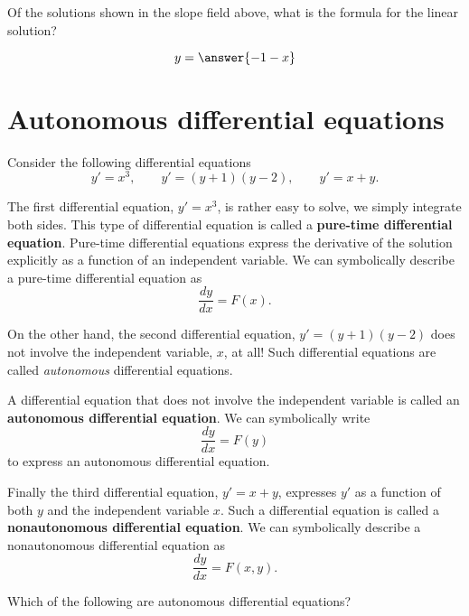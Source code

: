 \documentclass{ximera}
\begin{document}
\begin{question}
  Of the solutions shown in the slope field above, what is the formula
  for the linear solution?
  \begin{prompt}
    \[
    y = \answer{-1-x}
    \]
  \end{prompt}
\end{question}



\section{Autonomous differential equations}


Consider the following differential equations
\[
y' = x^3,\qquad y'=(y+1)(y-2), \qquad y'= x+y.
\]

The first differential equation, $y' = x^3$, is rather easy to solve,
we simply integrate both sides. This type of differential equation is
called a \textbf{pure-time differential equation}. Pure-time differential
equations express the derivative of the solution explicitly as a
function of an independent variable. We can symbolically describe a
pure-time differential equation as
\[
\frac{dy}{dx} = F(x).
\]

On the other hand, the second differential equation, $y'=(y+1)(y-2)$
does not involve the independent variable, $x$, at all!  Such
differential equations are called \textit{autonomous} differential
equations.

\begin{definition}
  A differential equation that does not involve the independent
  variable is called an \textbf{autonomous differential equation}. We can
  symbolically write
  \[
  \frac{dy}{dx} = F(y)
  \]
  to express an autonomous differential equation.
\end{definition}

Finally the third differential equation, $y'= x+y$, expresses $y'$ as
a function of both $y$ and the independent variable $x$. Such a
differential equation is called a \textbf{nonautonomous differential
  equation}. We can symbolically describe  a nonautonomous differential equation as
\[
\frac{dy}{dx} = F(x,y).
\]
\begin{question}
  Which of the following are autonomous differential equations?
  \begin{selectAll}
  \end{selectAll}
\end{question}
\end{document}

